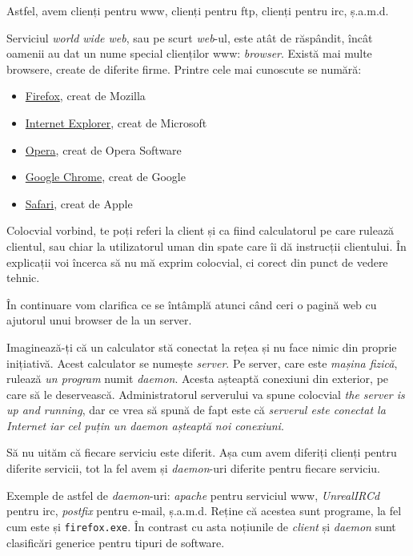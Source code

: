 Astfel, avem clienți pentru www, clienți pentru ftp, clienți pentru irc, ș.a.m.d.

Serviciul \textit{world wide web}, sau pe scurt \textit{web}-ul, este atât de răspândit, încât
oamenii au dat un nume special clienților www: \textsl{browser}. Există mai multe browsere,
create de diferite firme. Printre cele mai cunoscute se numără:
\begin{itemize}
\item \href{http://en.wikipedia.org/wiki/Firefox}{Firefox}, creat de Mozilla
\item \href{http://en.wikipedia.org/wiki/Internet_explorer}{Internet Explorer}, creat de Microsoft
\item \href{http://en.wikipedia.org/wiki/Opera_(web_browser)}{Opera}, creat de Opera Software
\item \href{http://en.wikipedia.org/wiki/Chrome_(web_browser)}{Google Chrome}, creat de Google
\item \href{http://en.wikipedia.org/wiki/Safari_(browser)}{Safari}, creat de Apple
\end{itemize}

Colocvial vorbind, te poți referi la client și
ca fiind calculatorul pe care rulează clientul, sau chiar la utilizatorul uman din spate
care îi dă instrucții clientului. În explicații voi încerca să nu mă exprim colocvial, ci
corect din punct de vedere tehnic.

În continuare vom clarifica ce se întâmplă atunci când ceri o pagină web cu ajutorul
unui browser de la un server.

Imaginează-ți că un calculator stă conectat la rețea și
nu face nimic din {\glqq}proprie inițiativă{\grqq}.
Acest calculator se numește \textsl{server}. Pe server, care este
\textit{mașina fizică}, rulează \textit{un program} numit \textsl{daemon}.
Acesta așteaptă conexiuni din
exterior, pe care să le deservească. Administratorul serverului va spune colocvial
\textit{the server is up and running}, dar ce vrea să spună de fapt este că \textit{serverul
este conectat la Internet iar cel puțin un daemon așteaptă noi conexiuni}.

Să nu uităm că fiecare serviciu este diferit. Așa cum avem diferiți clienți pentru
diferite servicii, tot la fel avem și \textit{daemon}-uri diferite pentru fiecare serviciu.

Exemple de astfel de \textit{daemon}-uri: \textsl{apache} pentru serviciul
www, \textsl{UnrealIRCd} pentru irc,
\textsl{postfix} pentru e-mail, ș.a.m.d. Reține că acestea sunt programe, la fel
cum este și \texttt{firefox.exe}. În contrast cu asta noțiunile de \textit{client} și
\textit{daemon} sunt clasificări
generice pentru tipuri de software.

